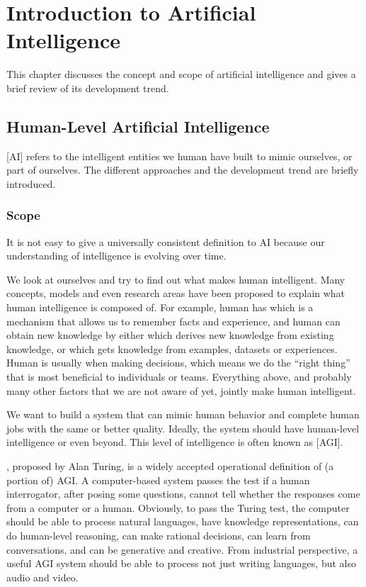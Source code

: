 \chapter{Introduction to Artificial Intelligence}

This chapter discusses the concept and scope of artificial intelligence and gives a brief review of its development trend.

\section{Human-Level Artificial Intelligence}

[AI] refers to the intelligent entities we human have built to mimic ourselves, or part of ourselves. The different approaches and the development trend are briefly introduced.

\subsection{Scope}

It is not easy to give a universally consistent definition to AI because our understanding of intelligence is evolving over time. 

We look at ourselves and try to find out what makes human intelligent. Many concepts, models and even research areas have been proposed to explain what human intelligence is composed of. For example, human has  which is a mechanism that allows us to remember facts and experience, and human can obtain new knowledge by either  which derives new knowledge from existing knowledge, or  which gets knowledge from examples, datasets or experiences. Human is usually  when making decisions, which means we do the ``right thing'' that is most beneficial to individuals or teams. Everything above, and probably many other factors that we are not aware of yet, jointly make human intelligent.

We want to build a system that can mimic human behavior and complete human jobs with the same or better quality. Ideally, the system should have human-level intelligence or even beyond. This level of intelligence is often known as [AGI]. 

, proposed by Alan Turing, is a widely accepted operational definition of (a portion of) AGI. A computer-based system passes the test if a human interrogator, after posing some questions, cannot tell whether the responses come from a computer or a human. Obviously, to pass the Turing test, the computer should be able to process natural languages, have knowledge representations, can do human-level reasoning, can make rational decisions, can learn from conversations, and can be generative and creative. From industrial perspective, a useful AGI system should be able to process not just writing languages, but also audio and video.

